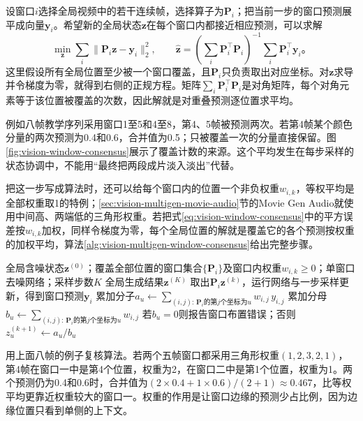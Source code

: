 设窗口$i$选择全局视频中的若干连续帧，选择算子为$\bm P_i$；把当前一步的窗口预测展平成向量$\bm y_i$。希望新的全局状态$\bm z$在每个窗口内都接近相应预测，可以求解
\begin{equation}
  \min_{\bm z}\sum_i\lVert\bm P_i\bm z-\bm y_i\rVert_2^2,
  \qquad
  \widehat{\bm z}
  =\left(\sum_i\bm P_i^\top\bm P_i\right)^{-1}
     \sum_i\bm P_i^\top\bm y_i\text{。}
  \label{eq:vision-window-consensus}
\end{equation}
这里假设所有全局位置至少被一个窗口覆盖，且$\bm P_i$只负责取出对应坐标。对$\bm z$求导并令梯度为零，就得到右侧的正规方程。矩阵$\sum_i\bm P_i^\top\bm P_i$是对角矩阵，每个对角元素等于该位置被覆盖的次数，因此解就是对重叠预测逐位置求平均。

例如八帧教学序列采用窗口1至5和4至8，第4、5帧被预测两次。若第4帧某个颜色分量的两次预测为0.4和0.6，合并值为0.5；只被覆盖一次的分量直接保留。图\ref{fig:vision-window-consensus}展示了覆盖计数的来源。这个平均发生在每步采样的状态协调中，不能用“最终把两段成片淡入淡出”代替。

把这一步写成算法时，还可以给每个窗口内的位置一个非负权重$w_{i,k}$，等权平均是全部权重取1的特例；\ref{sec:vision-multigen-movie-audio}节的Movie Gen Audio就使用中间高、两端低的三角形权重。若把式\eqref{eq:vision-window-consensus}中的平方误差按$w_{i,k}$加权，同样令梯度为零，每个全局位置的解就是覆盖它的各个预测按权重的加权平均，算法\ref{alg:vision-multigen-window-consensus}给出完整步骤。

\begin{algorithm}[重叠窗口的逐步共同更新]
  \label{alg:vision-multigen-window-consensus}
  \begin{algorithmic}[1]
    \Require 全局含噪状态$\bm z^{(0)}$；覆盖全部位置的窗口集合$\{\bm P_i\}$及窗口内权重$w_{i,k}\geq0$；单窗口去噪网络；采样步数$K$
    \Ensure 全局生成结果$\bm z^{(K)}$
        \State 取出$\bm P_i\bm z^{(k)}$，运行网络与一步采样更新，得到窗口预测$\bm y_i$
      \EndFor
        \State 累加分子$a_u\gets\sum_{(i,j):\,\bm P_i\text{的第}j\text{个坐标为}u}w_{i,j}\,y_{i,j}$
        \State 累加分母$b_u\gets\sum_{(i,j):\,\bm P_i\text{的第}j\text{个坐标为}u}w_{i,j}$
        \State 若$b_u=0$则报告窗口布置错误；否则$z^{(k+1)}_u\gets a_u/b_u$
      \EndFor
    \EndFor
  \end{algorithmic}
\end{algorithm}

用上面八帧的例子复核算法。若两个五帧窗口都采用三角形权重$(1,2,3,2,1)$，第4帧在窗口一中是第4个位置，权重为2，在窗口二中是第1个位置，权重为1。两个预测仍为0.4和0.6时，合并值为$(2\times0.4+1\times0.6)/(2+1)\approx0.467$，比等权平均更靠近权重较大的窗口一。权重的作用是让窗口边缘的预测少占比例，因为边缘位置只看到单侧的上下文。

